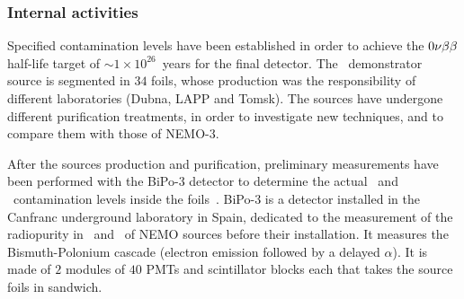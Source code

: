 \subsubsection*{Internal activities}


Specified contamination levels have been established in order to achieve the $0\nu\beta\beta$ half-life target of $\sim 1\times 10^{26}$~years for the final detector.
The \Se\ demonstrator source is segmented in $34$ foils, whose production was the responsibility of different laboratories (Dubna, LAPP and Tomsk).
The sources have undergone different purification treatments, in order to investigate new techniques, and to compare them with those of NEMO-$3$.

After the sources production and purification, preliminary measurements have been performed with the BiPo-$3$ detector to determine the actual \Tl\ and \Bi\ contamination levels inside the foils~\cite{internal:bipo}.
BiPo-$3$ is a detector installed in the Canfranc underground laboratory in Spain, dedicated to the measurement of the radiopurity in \Tl\ and \Bi\ of NEMO sources before their installation.
It measures the Bismuth-Polonium cascade (electron emission followed by a delayed $\alpha$).
It is made of $2$ modules of $40$ PMTs and scintillator blocks each that takes the source foils in sandwich.

